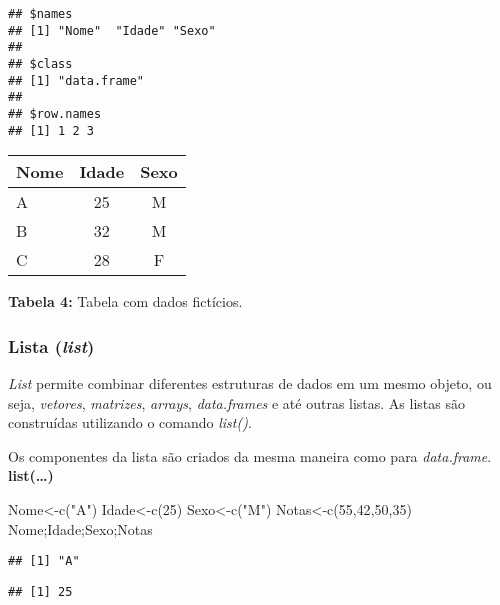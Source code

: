 \documentclass[
]{book}
\newenvironment{Shaded}{\begin{snugshade}}{\end{snugshade}}
\newcommand{\DecValTok}[1]{\textcolor[rgb]{0.00,0.00,0.81}{#1}}
\newcommand{\FunctionTok}[1]{\textcolor[rgb]{0.00,0.00,0.00}{#1}}
\newcommand{\NormalTok}[1]{#1}
\newcommand{\OtherTok}[1]{\textcolor[rgb]{0.56,0.35,0.01}{#1}}
\newcommand{\StringTok}[1]{\textcolor[rgb]{0.31,0.60,0.02}{#1}}
\begin{document}
\begin{verbatim}
## $names
## [1] "Nome"  "Idade" "Sexo" 
## 
## $class
## [1] "data.frame"
## 
## $row.names
## [1] 1 2 3
\end{verbatim}

\begin{tabular}{l|c|c}
\hline
Nome & Idade & Sexo\\
\hline
A & 25 & M\\
\hline
B & 32 & M\\
\hline
C & 28 & F\\
\hline
\end{tabular}

\textbf{Tabela 4:} Tabela com dados fictícios.

\hypertarget{lista-list}{%
\subsubsection{\texorpdfstring{Lista (\emph{list})}{Lista (list)}}\label{lista-list}}

\emph{List} permite combinar diferentes estruturas de dados em um mesmo objeto, ou seja, \emph{vetores}, \emph{matrizes}, \emph{arrays}, \emph{data.frames} e até outras listas.
As listas são construídas utilizando o comando \emph{list()}.

Os componentes da lista são criados da mesma maneira como para \emph{data.frame}.
\textbf{list(\ldots)}

\begin{Shaded}
\begin{Highlighting}[]
\NormalTok{Nome}\OtherTok{\textless{}{-}}\FunctionTok{c}\NormalTok{(}\StringTok{"A"}\NormalTok{)}
\NormalTok{Idade}\OtherTok{\textless{}{-}}\FunctionTok{c}\NormalTok{(}\DecValTok{25}\NormalTok{)}
\NormalTok{Sexo}\OtherTok{\textless{}{-}}\FunctionTok{c}\NormalTok{(}\StringTok{"M"}\NormalTok{)}
\NormalTok{Notas}\OtherTok{\textless{}{-}}\FunctionTok{c}\NormalTok{(}\DecValTok{55}\NormalTok{,}\DecValTok{42}\NormalTok{,}\DecValTok{50}\NormalTok{,}\DecValTok{35}\NormalTok{)}
\NormalTok{Nome;Idade;Sexo;Notas}
\end{Highlighting}
\end{Shaded}

\begin{verbatim}
## [1] "A"
\end{verbatim}

\begin{verbatim}
## [1] 25
\end{verbatim}
\end{document}
